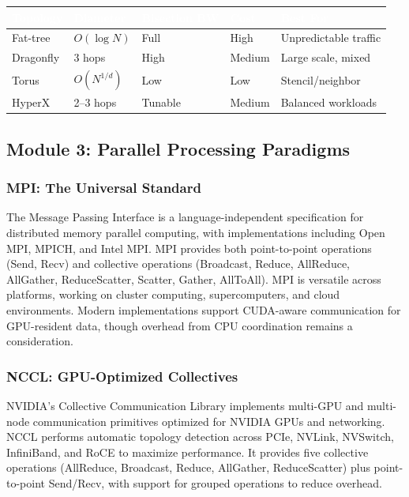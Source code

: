 \documentclass[11pt,letterpaper]{article}
\newcommand{\tableheader}[1]{\textbf{\sffamily\textcolor{white}{#1}}}
\begin{document}
\begin{center}
\begin{tabularx}{\textwidth}{L{2.5cm}L{2.5cm}L{2.5cm}L{2.5cm}X}
\toprule
{}
\tableheader{Topology} & \tableheader{Diameter} & \tableheader{Bisection BW} & \tableheader{Cost} & \tableheader{Best For} \\
\midrule
Fat-tree & $O(\log N)$ & Full & High & Unpredictable traffic \\
Dragonfly & 3 hops & High & Medium & Large scale, mixed \\
Torus & $O(N^{1/d})$ & Low & Low & Stencil/neighbor \\
HyperX & 2--3 hops & Tunable & Medium & Balanced workloads \\
\bottomrule
\end{tabularx}
\end{center}

\subsection{Module 3: Parallel Processing Paradigms}

\subsubsection{MPI: The Universal Standard}

The Message Passing Interface is a language-independent specification for distributed memory parallel computing, with implementations including Open MPI, MPICH, and Intel MPI. MPI provides both point-to-point operations (Send, Recv) and collective operations (Broadcast, Reduce, AllReduce, AllGather, ReduceScatter, Scatter, Gather, AllToAll). MPI is versatile across platforms, working on cluster computing, supercomputers, and cloud environments. Modern implementations support CUDA-aware communication for GPU-resident data, though overhead from CPU coordination remains a consideration.

\subsubsection{NCCL: GPU-Optimized Collectives}

NVIDIA's Collective Communication Library implements multi-GPU and multi-node communication primitives optimized for NVIDIA GPUs and networking. NCCL performs automatic topology detection across PCIe, NVLink, NVSwitch, InfiniBand, and RoCE to maximize performance. It provides five collective operations (AllReduce, Broadcast, Reduce, AllGather, ReduceScatter) plus point-to-point Send/Recv, with support for grouped operations to reduce overhead.
\end{document}
